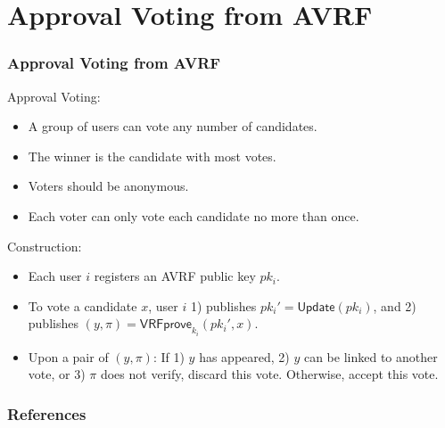 \documentclass{beamer}
\begin{document}
\section{Approval Voting from AVRF}

\begin{frame}
\frametitle{Approval Voting from AVRF}

Approval Voting:
\begin{itemize}
    \item A group of users can vote any number of candidates.
    \item The winner is the candidate with most votes.
    \item Voters should be anonymous.
    \item Each voter can only vote each candidate no more than once.
\end{itemize}

Construction:
\begin{itemize}
    \item Each user $i$ registers an AVRF public key $pk_i$.
    \item To vote a candidate $x$, user $i$ 1) publishes $pk_i' = \mathsf{Update}(pk_i)$, and 2) publishes $(y, \pi) = \mathsf{VRFprove}_{k_i}(pk_i', x)$.
    \item Upon a pair of $(y, \pi)$: If 1) $y$ has appeared, 2) $y$ can be linked to another vote, or 3) $\pi$ does not verify, discard this vote. Otherwise, accept this vote.
\end{itemize}

\end{frame}

\begin{frame}[allowframebreaks]
    \frametitle{References}
    
    \tiny
\end{frame}
\end{document}
